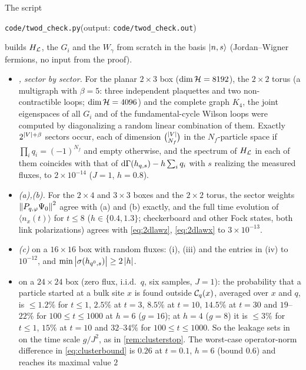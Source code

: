 \begin{remark}\label{rem:2dED}
The script
\begin{center}
\texttt{code/twod\_check.py}\quad(output: \texttt{code/twod\_check.out})
\end{center}
builds $H_{\mathcal{L}}$, the $G_i$ and the $W_\gamma$ from scratch in the basis $|n,s\rangle$ (Jordan--Wigner fermions, no input from the proof).
\begin{itemize}
\item \emph{, sector by sector.}  For the planar $2\times3$ box ($\dim\mathcal{H}=8192$), the
$2\times2$ torus (a multigraph with $\beta=5$: three independent plaquettes and two non-contractible loops;
$\dim\mathcal{H}=4096$) and the complete graph $K_4$, the joint eigenspaces of all $G_i$ and of the fundamental-cycle
Wilson loops were computed by diagonalizing a random linear combination of them.  Exactly $2^{\left|V\right|+\beta}$
sectors occur, each of dimension $\binom{\left|V\right|}{N_f}$ in the $N_f$-particle space if
$\prod_iq_i=(-1)^{N_f}$ and empty otherwise, and the spectrum of $H_{\mathcal{L}}$ in each of them coincides with that
of $\mathrm{d}\Gamma(h_{q,s})-h\sum_iq_i$ with $s$ realizing the measured fluxes, to $2\times10^{-14}$ ($J=1$, $h=0.8$).
\item \emph{(a),(b).}  For the $2\times4$ and $3\times3$ boxes and the $2\times2$ torus, the
sector weights $\left\|P_{q,\varphi}\Psi_0\right\|^2$ agree with (a) and (b) exactly, and the full time evolution of
$\langle n_x(t)\rangle$ for $t\le8$ ($h\in\{0.4,1.3\}$; checkerboard and other Fock states, both link
polarizations) agrees with \eqref{eq:2dlawz}, \eqref{eq:2dlawx} to $3\times10^{-13}$.
\item \emph{(c)} on a $16\times16$ box with random fluxes: (i), (iii) and the entries in (iv) to
$10^{-12}$, and $\min\left|\sigma(h_{q^0,s})\right|\ge2\left|h\right|$.
\item \emph{} on a $24\times24$ box (zero flux, i.i.d.\ $q$, six samples, $J=1$): the probability
that a particle started at a bulk site $x$ is found outside $\mathcal{C}_q(x)$, averaged over $x$ and $q$, is
$\le1.2\%$ for $t\le1$, $2.5\%$ at $t=3$, $8.5\%$ at $t=10$, $14.5\%$ at $t=30$ and $19$--$22\%$ for $100\le t\le1000$ at
$h=6$ ($g=16$); at $h=4$ ($g=8$) it is $\le3\%$ for $t\le1$, $15\%$ at $t=10$ and $32$--$34\%$ for $100\le t\le1000$.  So
the leakage sets in on the time scale $g/J^2$, as in \cref{rem:clusterstop}.  The worst-case operator-norm
difference in \eqref{eq:clusterbound} is $0.26$ at $t=0.1$, $h=6$ (bound $0.6$) and reaches its maximal value $2$

\end{itemize}
\end{remark}
